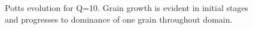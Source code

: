 \documentclass{report}
\begin{document}
        \begin{figure}[!htb]
            \label{fig:Potts}
            \caption{Potts evolution for Q=10.  Grain growth is evident in initial stages and progresses to dominance of one grain throughout domain.}
        \end{figure}
\end{document}
